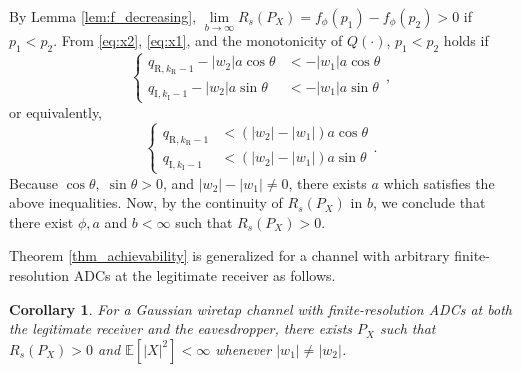 \documentclass[journal]{IEEEtran}
\newtheorem{corollary}[theorem]{Corollary}
\begin{document}
\begin{IEEEproof}
By Lemma \ref{lem:f_decreasing}, $\lim\limits_{b\rightarrow \infty} R_s(P_X) = f_\phi (p_1) - f_\phi (p_2)>0$ if ${p_1<p_2}$.
From \eqref{eq:x2}, \eqref{eq:x1}, and the monotonicity of $Q(\cdot)$, ${p_1<p_2}$ holds if 
\begin{equation}
    \begin{cases} q_{\mathrm{R},k_{\mathrm{R}}-1}-|w_2|a\cos\theta &< -|w_1|a \cos \theta \\ q_{\mathrm{I},k_{\mathrm{I}}-1}-|w_2|a\sin\theta &< -|w_1|a \sin \theta \end{cases},
\end{equation}
or equivalently,
\begin{equation}
    \begin{cases} q_{\mathrm{R},k_{\mathrm{R}}-1} &< (|w_2|-|w_1|)a \cos \theta \\ q_{\mathrm{I},k_{\mathrm{I}}-1} &< (|w_2|-|w_1|)a \sin \theta \end{cases}. \label{eq:complex_achieve_a}
\end{equation}
Because $\cos \theta, \; \sin\theta >0$, and $|w_2|-|w_1| \neq 0$, there exists $a$ which satisfies the above inequalities. Now, by the continuity of $R_s(P_X)$ in $b$, we conclude that  there exist $\phi,a$ and $b<\infty$ such that $R_s(P_X)>0$.
\end{IEEEproof}

Theorem \ref{thm_achievability} is generalized for a channel with arbitrary finite-resolution ADCs at the legitimate receiver as follows. 
\begin{corollary}\label{cor:general}
For a Gaussian wiretap channel with finite-resolution ADCs at both the legitimate receiver and the eavesdropper, there exists $P_X$ such that $R_s(P_X)>0$ and $\mathbb{E}[|X|^2] < \infty$ whenever $|w_1|\neq |w_2|$.
\end{corollary}
\end{document}
